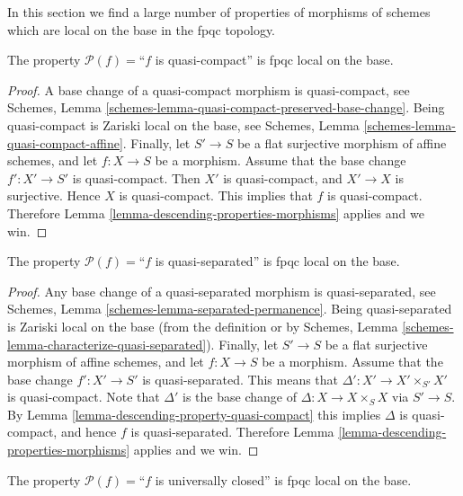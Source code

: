 \noindent
In this section we find a large number of properties
of morphisms of schemes which are local on the base
in the fpqc topology.

\begin{lemma}
\label{lemma-descending-property-quasi-compact}
The property $\mathcal{P}(f) =$``$f$ is quasi-compact''
is fpqc local on the base.
\end{lemma}

\begin{proof}
A base change of a quasi-compact morphism is quasi-compact, see
Schemes, Lemma \ref{schemes-lemma-quasi-compact-preserved-base-change}.
Being quasi-compact is Zariski local on the base, see
Schemes, Lemma \ref{schemes-lemma-quasi-compact-affine}.
Finally, let
$S' \to S$ be a flat surjective morphism of affine schemes,
and let $f : X \to S$ be a morphism. Assume that the base change
$f' : X' \to S'$ is quasi-compact. Then $X'$ is quasi-compact,
and $X' \to X$ is surjective. Hence $X$ is quasi-compact.
This implies that $f$ is quasi-compact.
Therefore Lemma \ref{lemma-descending-properties-morphisms} applies and we win.
\end{proof}

\begin{lemma}
\label{lemma-descending-property-quasi-separated}
The property $\mathcal{P}(f) =$``$f$ is quasi-separated''
is fpqc local on the base.
\end{lemma}

\begin{proof}
Any base change of a quasi-separated morphism is quasi-separated, see
Schemes, Lemma \ref{schemes-lemma-separated-permanence}.
Being quasi-separated is Zariski local on the base (from the
definition or by
Schemes, Lemma \ref{schemes-lemma-characterize-quasi-separated}).
Finally, let
$S' \to S$ be a flat surjective morphism of affine schemes,
and let $f : X \to S$ be a morphism. Assume that the base change
$f' : X' \to S'$ is quasi-separated. This means that
$\Delta' : X' \to X'\times_{S'} X'$ is quasi-compact.
Note that $\Delta'$ is the base change of $\Delta : X \to X \times_S X$
via $S' \to S$. By Lemma \ref{lemma-descending-property-quasi-compact}
this implies $\Delta$ is quasi-compact, and hence $f$ is
quasi-separated.
Therefore Lemma \ref{lemma-descending-properties-morphisms} applies and we win.
\end{proof}

\begin{lemma}
\label{lemma-descending-property-universally-closed}
The property $\mathcal{P}(f) =$``$f$ is universally closed''
is fpqc local on the base.
\end{lemma}

